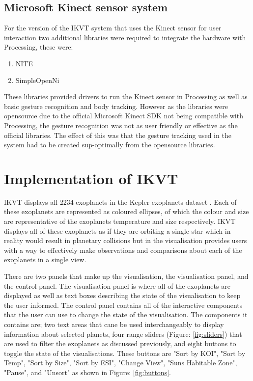 \subsection{Microsoft Kinect sensor system}
For the version of the IKVT system that uses the Kinect sensor for user
interaction two additional libraries were required to integrate the hardware
with Processing, these were:
\begin{enumerate}
 \item NITE \cite{nite}
 \item SimpleOpenNi \cite{simpleopenni}
\end{enumerate}
These libraries provided drivers to run the Kinect sensor in Processing as well
as basic gesture recognition and body tracking. However as the libraries were
opensource due to the official Microsoft Kinect SDK not being compatible with
Processing, the gesture recognition was not as user friendly or effective as the
official libraries. The effect of this was that the gesture tracking used in the
system had to be created sup-optimally from the opensource libraries. 

\section{Implementation of IKVT}

IKVT displays all 2234 exoplanets
in the Kepler exoplanets dataset \cite{dataset}. Each of these exoplanets are
represented as coloured
ellipses, of which the colour and size are representative of the exoplanets
temperature and size respectively. IKVT displays all of these exoplanets as if
they are orbiting a single star which in reality would result in planetary
collisions but in the visualisation provides users with a way to effectively
make observations and comparisons about each of the exoplanets in a single
view. 

There are two panels that make up the visualisation, the visualisation panel,
and the control panel. The visualisation panel is where all of the exoplanets
are displayed as well as text boxes describing the state of the visualisation to
keep the user informed. The control panel contains all of the interactive
components that the user can use to change the state of the visualisation. The
components it contains are; two text areas that cane be used interchangeably to
display information about selected planets, four range sliders (Figure: \ref{fig:sliders}) that are used to
filter the exoplanets as discussed previously, and eight buttons to toggle the
state of the visualisations. These buttons are "Sort by KOI", "Sort by Temp",
"Sort by Size", "Sort by ESI", "Change View", "Suns Habitable Zone", "Pause",
and "Unsort" as shown in Figure: \ref{fig:buttons}. 

